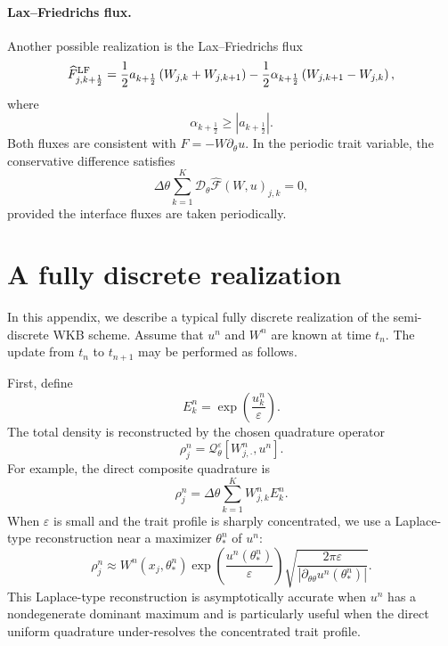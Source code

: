 \documentclass[11pt, dina4, amsfont12]{article}
\begin{document}
\paragraph{Lax--Friedrichs flux.}
Another possible realization is the Lax--Friedrichs flux
\[
\widehat F_{j,k+\frac12}^{\rm LF}
=
\frac12 a_{k+\frac12}
\left(W_{j,k}+W_{j,k+1}\right)
-
\frac12 \alpha_{k+\frac12}
\left(W_{j,k+1}-W_{j,k}\right),
\]
where
\[
\alpha_{k+\frac12}\ge |a_{k+\frac12}|.
\]
Both fluxes are consistent with \(F=-W\partial_\theta u\). In the periodic
trait variable, the conservative difference satisfies
\[
\Delta\theta
\sum_{k=1}^K
\mathcal D_\theta\widehat{\mathcal F}(W,u)_{j,k}
=
0,
\]
provided the interface fluxes are taken periodically.

\section{A fully discrete realization} \label{append:full_discretization}

In this appendix, we describe a typical fully discrete realization of the
semi-discrete WKB scheme. Assume that \(u^n\) and \(W^n\) are known at time
\(t_n\). The update from \(t_n\) to \(t_{n+1}\) may be performed as follows.

First, define
\[
E_k^n=
\exp\!\left(\frac{u_k^n}{\varepsilon}\right).
\]
The total density is reconstructed by the chosen quadrature operator
\[
\rho_j^n
=
\mathcal Q_\theta^\varepsilon[W_{j,\cdot}^n,u^n].
\]
For example, the direct composite quadrature is
\[
\rho_j^n
=
\Delta\theta
\sum_{k=1}^K
W_{j,k}^n E_k^n .
\]
When \(\varepsilon\) is small and the trait profile is sharply concentrated,
we use a Laplace-type reconstruction near a maximizer \(\theta_*^n\) of
\(u^n\):
\[
\rho_j^n
\approx
W^n(x_j,\theta_*^n)
\exp\!\left(\frac{u^n(\theta_*^n)}{\varepsilon}\right)
\sqrt{
\frac{2\pi\varepsilon}
{\left|\partial_{\theta\theta}u^n(\theta_*^n)\right|}
}.
\]
This Laplace-type reconstruction is asymptotically accurate when
\(u^n\) has a nondegenerate dominant maximum and is particularly useful when
the direct uniform quadrature under-resolves the concentrated trait profile.

\end{document}
